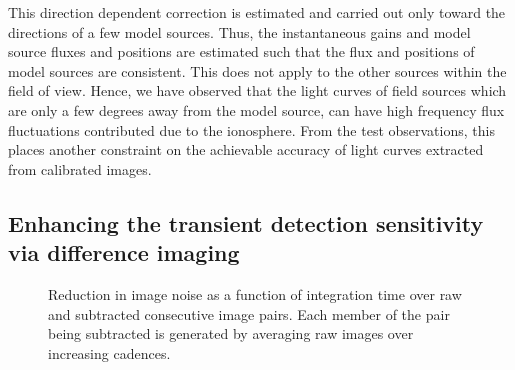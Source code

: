 \documentclass{aa}
\begin{document}
This direction dependent correction is estimated and carried out only toward the
directions  of a  few model  sources. Thus,  the instantaneous  gains  and model
source fluxes  and positions are estimated  such that the flux  and positions of
model sources  are consistent. This does  not apply to the  other sources within
the  field of  view. Hence,  we have  observed that  the light  curves  of field
sources which are  only a few degrees  away from the model source,  can have high
frequency flux  fluctuations contributed  due to the  ionosphere. From  the test
observations, this places another constraint on the achievable accuracy of light
curves extracted from calibrated images.


\subsection{\label{sub:Enhancing-the-transient}Enhancing the transient detection
sensitivity via difference imaging} 

\begin{figure}[h]
\caption{\label{fig:Reduction-in-image}Reduction in image noise as a function of
  integration  time over  raw  and subtracted  consecutive  image pairs.   Each
  member of the pair being subtracted is generated by averaging raw images over
  increasing  cadences.}
\end{figure}
\end{document}
